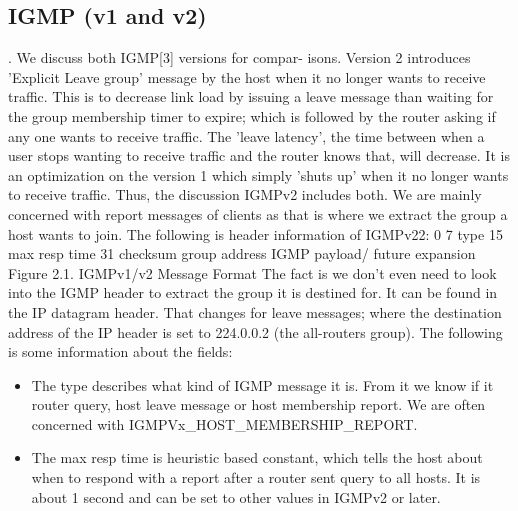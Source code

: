 \documentclass[11pt,left=2cm,bottom=2cm,oneside]{book}
\begin{document}
\subsection{IGMP (v1 and v2)}. We discuss both IGMP[3] versions for compar-
isons. Version 2 introduces 'Explicit Leave group' message by the host when it
no longer wants to receive traffic. This is to decrease link load by issuing a
leave
message than waiting for the group membership timer to expire; which is
followed
by the router asking if any one wants to receive traffic. The 'leave latency',
the
time between when a user stops wanting to receive traffic and the router knows
that, will decrease. It is an optimization on the version 1 which simply
'shuts up'
when it no longer wants to receive traffic. Thus, the discussion IGMPv2
includes
both. We are mainly concerned with report messages of clients as that is where
we extract the group a host wants to join. The following is header information
of
IGMPv22:
0
7
type
15
max resp time
31
checksum
group address
IGMP payload/ future expansion
Figure 2.1. IGMPv1/v2 Message Format
The fact is we don't even need to look into the IGMP header to extract the group
it is destined for. It can be found in the IP datagram header. That changes
for
leave messages; where the destination address of the IP header is set to
224.0.0.2
(the all-routers group). The following is some information about the fields:
\begin{itemize}
\item The type describes what kind of IGMP message it is. From it we know
if it router query, host leave message or host membership report. We are
often concerned with IGMPV{x}\_HOST\_MEMBERSHIP\_REPORT.
\item The max resp time is heuristic based constant, which tells the host about
when to respond with a report after a router sent query to all hosts. It is
about 1 second and can be set to other values in IGMPv2 or later.
\end{itemize}
\end{document}
